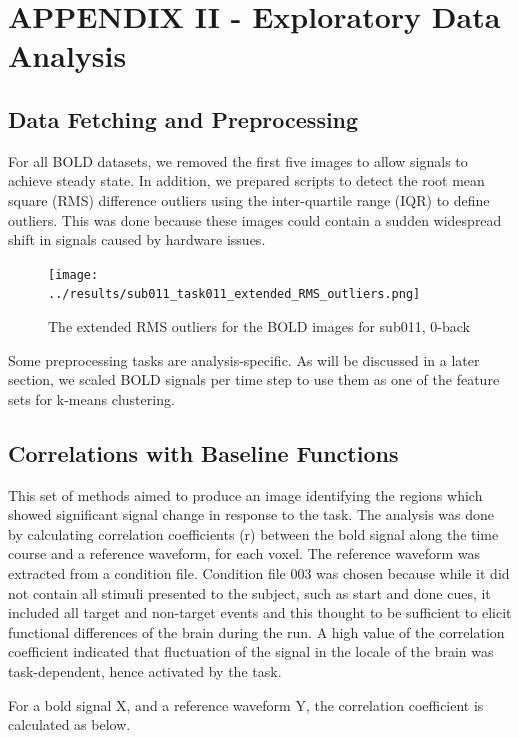 \documentclass[11pt]{article}
\begin{document}
\section{APPENDIX II - Exploratory Data Analysis}

\subsection{Data Fetching and Preprocessing}

For all BOLD datasets, we removed the first five images to allow signals to
achieve steady state. In addition, we prepared scripts to detect the root mean
square (RMS) difference outliers using the inter-quartile range (IQR) to define
outliers. This was done because these images could contain a sudden widespread
shift in signals caused by hardware issues.

\begin{figure}[H]
\centering
\texttt{[image: ../results/sub011\_task011\_extended\_RMS\_outliers.png]}
\caption{The extended RMS outliers for the BOLD images for sub011, 0-back}
\end{figure} 

Some preprocessing tasks are analysis-specific. As will be discussed in a later
section, we scaled BOLD signals per time step to use them as one of the feature
sets for k-means clustering. 

\subsection{Correlations with Baseline Functions}

This set of methods aimed to produce an image identifying the regions which showed
significant signal change in response to the task. The analysis was done by calculating 
correlation coefficients (r) between the bold signal along the time course and a reference
waveform, for each voxel. The reference waveform was extracted from a condition file.
Condition file 003 was chosen because while it did not contain all stimuli presented to the
subject, such as start and done cues, it included all target and non-target events and this
thought to be sufficient to elicit functional differences of the brain during the run. 
A high value of the correlation coefficient indicated that fluctuation of the signal in 
the locale of the brain was task-dependent, hence activated by the task. 

For a bold signal X, and a reference waveform Y, the correlation coefficient is
calculated as below.
\end{document}
